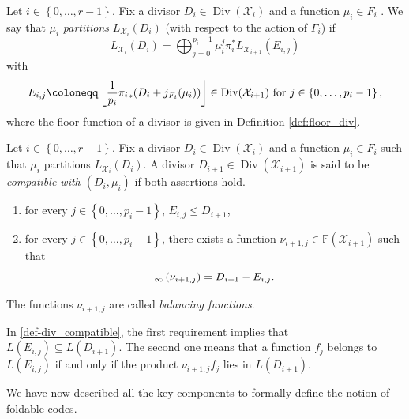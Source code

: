 \documentclass[10pt,a4paper]{article}
\newcommand\F{\mathbb{F}}
\newcommand\floor[1]{\left\lfloor #1 \right\rfloor}
\newcommand\poles[1]{\div_\infty\left( #1 \right)}
\DeclareMathOperator{\Div}{Div}
\let\div\relax\DeclareMathOperator{\div}{div}
\newcommand{\set}[1]{\left\{#1\right\}}
\newcommand{\range}[1]{\set{0,\dots,#1-1}}
\newcommand\calX{\mathcal{X}}
\newcommand\mydef{\coloneqq}
\theoremstyle{plain}
\theoremstyle{plain}
\theoremstyle{definition}
\theoremstyle{remark}
\theoremstyle{plain}
\begin{document}
\begin{definition}\label{def:mu-decomp}
	Let $i \in \range{r}$. Fix a divisor $D_i \in \Div(\calX_i)$ and a function $\mu_i \in F_i$ . We say that $\mu_i$ \emph{partitions} $L_{\calX_i}(D_i)$ (with respect to the action of $\Gamma_i$) if
	\begin{equation}\label{eq:decomposition}
		L_{\calX_i}(D_i)= \bigoplus_{j=0}^{p_i-1} \mu_i^j \pi_i^* L_{\calX_{i+1}}(E_{i,j})
	\end{equation}
	with
	\begin{equation}\label{eq:def-Eij}
		E_{i,j}\mydef \floor{\frac{1}{p_i}{\pi_i}_*( D_i + j\div_{F_i}(\mu_i))} \in \Div(\calX_{i+1}) \text{ for } j \in \range{p_i},
	\end{equation}
	where the floor function of a divisor is given in Definition \ref{def:floor_div}.
\end{definition}

\begin{definition}\label{def-div_compatible}
	Let $i \in \range{r}$. Fix a divisor $D_i \in \Div(\calX_i)$ and a function $\mu_i \in F_i$ such that $\mu_i$ partitions $L_{\calX_i}(D_i)$. A divisor $D_{i+1} \in \Div(\calX_{i+1})$ is said to be \emph{compatible with $(D_i,\mu_i)$} if both assertions hold.
	\begin{enumerate}
		\item for every $j \in \range{p_i}$, $E_{i,j} \leq D_{i+1}$,
		\item  for every $j \in \range{p_i}$, there exists a function $\nu_{i+1,j}\in \F(\calX_{i+1})$ such that
		\begin{equation}\label{eq:def-nu_i,j}
			\poles{\nu_{i+1,j}}=D_{i+1} - E_{i,j}. 
		\end{equation}
	\end{enumerate}
	The functions $\nu_{i+1,j}$ are called \emph{balancing functions}.
\end{definition}


In \autoref{def-div_compatible}, the first requirement implies that $L(E_{i,j}) \subseteq L(D_{i+1})$. The second one means that a function $f_j$ belongs to $L(E_{i,j})$ if and only if the product $\nu_{i+1, j}f_j$ lies in $L(D_{i+1})$.

We have now described all the key components to formally define the notion of foldable codes.
\end{document}
